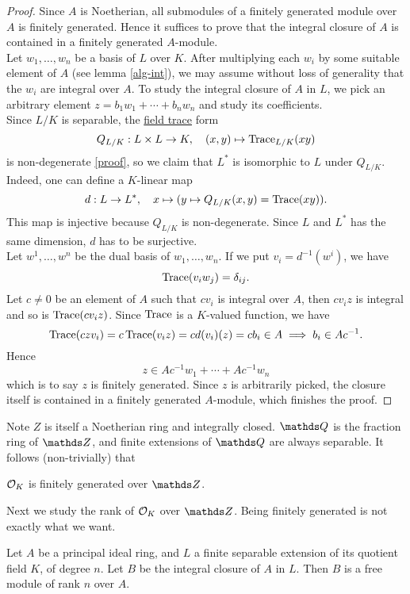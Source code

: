 			\begin{proof}
				Since $A$ is Noetherian, all submodules of a finitely generated module over $A$ is finitely generated. Hence it suffices to prove that the integral closure of $A$ is contained in a finitely generated $A$-module.\\
				Let $w_1,\dots,w_n$ be a basis of $L$ over $K$. After multiplying each $w_i$ by some suitable element of $A$ (see lemma \ref{alg-int}), we may assume without loss of generality that the $w_i$ are integral over $A$. To study the integral closure of $A$ in $L$, we pick an arbitrary element $z = b_1w_1+\cdots+b_nw_n$ and study its coefficients. \\
				Since $L/K$ is separable, the \href{https://stacks.math.columbia.edu/tag/0BIF}{field trace} form
				\[
					Q_{L/K}:L \times L \to K, \quad (x,y) \mapsto \operatorname{Trace}_{L/K}(xy)
				\]
				is non-degenerate  \href{https://stacks.math.columbia.edu/tag/0BIL}{[proof]}, so we claim that $L^\ast$ is isomorphic to $L$ under $Q_{L/K}$. Indeed, one can define a $K$-linear map
				\[
					d:L \to L^\ast, \quad x \mapsto (y \mapsto Q_{L/K}(x,y)=\operatorname{Trace}(xy)).
				\]
				This map is injective because $Q_{L/K}$ is non-degenerate. Since $L$ and $L^\ast$ has the same dimension, $d$ has to be surjective.\\
				Let $w^1,\dots,w^n$ be the dual basis of $w_1,\dots,w_n$. If we put $v_i=d^{-1}(w^i)$, we have
				\[
					\operatorname{Trace}(v_i w_j) = \delta_{ij}.
				\]
				Let $c \ne 0$ be an element of $A$ such that $cv_i$ is integral over $A$, then $cv_iz$ is integral and so is $\operatorname{Trace}(cv_iz)$. Since $\operatorname{Trace}$ is a $K$-valued function, we have
				\[
					\operatorname{Trace}(czv_i)=c\operatorname{Trace}(v_iz)=c d(v_i)(z) = cb_i \in A \implies b_i \in Ac^{-1}.
				\]
				Hence
				\[
					z \in Ac^{-1}w_1+\cdots+Ac^{-1}w_n
				\]
				which is to say $z$ is finitely generated. Since $z$ is arbitrarily picked, the closure itself is contained in a finitely generated $A$-module, which finishes the proof. 
			\end{proof}
			Note $Z$ is itself a Noetherian ring and integrally closed. $\Q$ is the fraction ring of $\Z$, and finite extensions of $\Q$ are always separable. It follows (non-trivially) that
			\begin{corollary}
				$\mathcal{O}_K$ is finitely generated over $\Z$.
			\end{corollary}
			
			Next we study the rank of $\mathcal{O}_K$ over $\Z$. Being finitely generated is not exactly what we want.
			
			\begin{theorem}
				Let $A$ be a principal ideal ring, and $L$ a finite separable extension of its quotient field $K$, of degree $n$. Let $B$ be the integral closure of $A$ in $L$. Then $B$ is a free module of rank $n$ over $A$. 
			\end{theorem}
		
